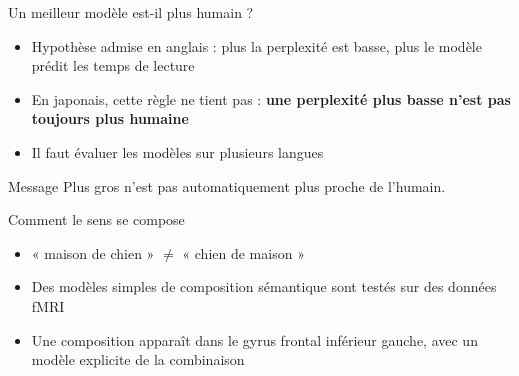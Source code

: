 \begin{frame}{Un meilleur modèle est-il plus humain ?}
\begin{itemize}
    \item Hypothèse admise en anglais : plus la perplexité est basse, plus le modèle prédit les temps de lecture
    \item En japonais, cette règle ne tient pas : \textbf{une perplexité plus basse n'est pas toujours plus humaine}
    \item Il faut évaluer les modèles sur plusieurs langues
\end{itemize}
\begin{block}{Message}
    Plus gros n'est pas automatiquement plus proche de l'humain.
\end{block}
\end{frame}

\begin{frame}{Comment le sens se compose}
\begin{itemize}
    \item « maison de chien » $\neq$ « chien de maison »
    \item Des modèles simples de composition sémantique sont testés sur des données fMRI
    \item Une composition apparaît dans le gyrus frontal inférieur gauche, avec un modèle explicite de la combinaison
\end{itemize}
\end{frame}
